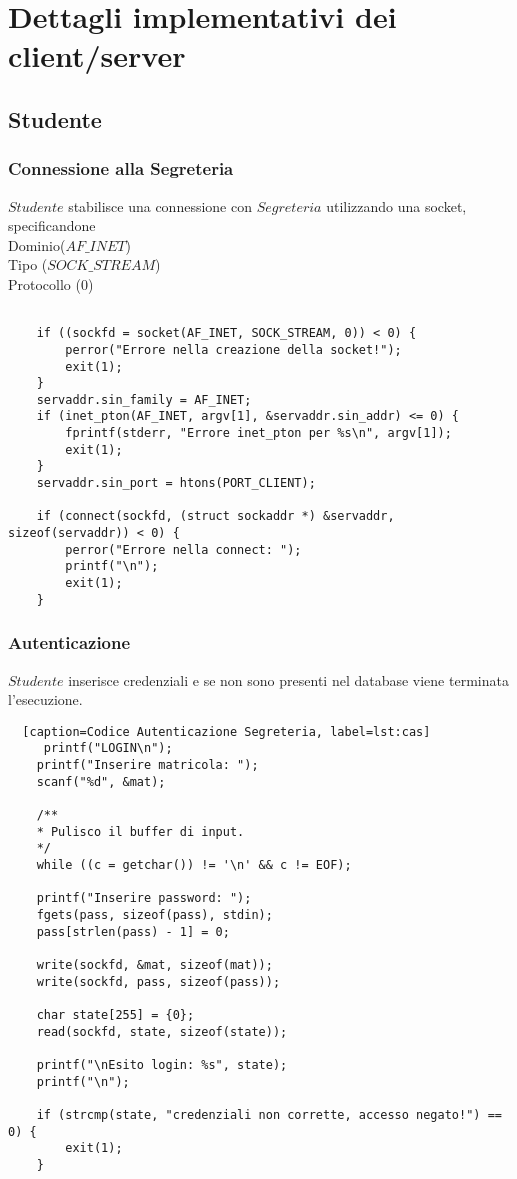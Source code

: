 \chapter{Dettagli implementativi dei client/server} 
\newpage


\section{Studente}
\subsection{Connessione alla Segreteria}
$Studente$ stabilisce una connessione con $Segreteria$ utilizzando una socket, specificandone\\
Dominio($AF\_INET$)\\
Tipo ($SOCK\_STREAM$)\\
Protocollo (0)\\
\begin{lstlisting}[caption=Codice Connessione Socket, label=lst:ccs]
	
	if ((sockfd = socket(AF_INET, SOCK_STREAM, 0)) < 0) {
		perror("Errore nella creazione della socket!");
		exit(1);
	}
	servaddr.sin_family = AF_INET;
	if (inet_pton(AF_INET, argv[1], &servaddr.sin_addr) <= 0) {
		fprintf(stderr, "Errore inet_pton per %s\n", argv[1]);
		exit(1);
	}
	servaddr.sin_port = htons(PORT_CLIENT);
	
	if (connect(sockfd, (struct sockaddr *) &servaddr, sizeof(servaddr)) < 0) {
		perror("Errore nella connect: ");
		printf("\n");
		exit(1);
	}
\end{lstlisting}
\newpage
\subsection{Autenticazione}
$Studente$ inserisce credenziali e se non sono presenti nel database viene terminata l'esecuzione.
\begin{lstlisting}	[caption=Codice Autenticazione Segreteria, label=lst:cas]
	 printf("LOGIN\n");
	printf("Inserire matricola: ");
	scanf("%d", &mat);
	
	/**
	* Pulisco il buffer di input.
	*/
	while ((c = getchar()) != '\n' && c != EOF);
	
	printf("Inserire password: ");
	fgets(pass, sizeof(pass), stdin);
	pass[strlen(pass) - 1] = 0;
	
	write(sockfd, &mat, sizeof(mat));
	write(sockfd, pass, sizeof(pass));
	
	char state[255] = {0};
	read(sockfd, state, sizeof(state));
	
	printf("\nEsito login: %s", state);
	printf("\n");
	
	if (strcmp(state, "credenziali non corrette, accesso negato!") == 0) {
		exit(1);
	}
	
\end{lstlisting}
\newpage
